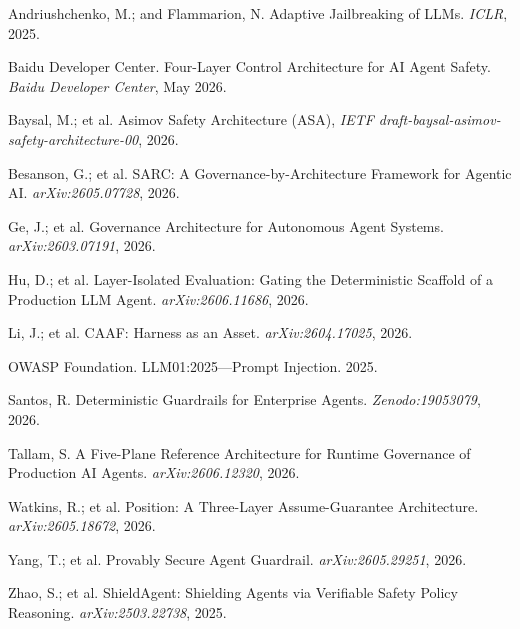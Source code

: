 \documentclass[letterpaper]{article}
\begin{document}

\begin{thebibliography}{}

Andriushchenko, M.; and Flammarion, N.
Adaptive Jailbreaking of LLMs.
{\em ICLR}, 2025.

Baidu Developer Center.
Four-Layer Control Architecture for AI Agent Safety.
{\em Baidu Developer Center}, May 2026.

Baysal, M.; et al.
Asimov Safety Architecture (ASA),
{\em IETF draft-baysal-asimov-safety-architecture-00}, 2026.

Besanson, G.; et al.
SARC: A Governance-by-Architecture Framework for Agentic AI.
{\em arXiv:2605.07728}, 2026.

Ge, J.; et al.
Governance Architecture for Autonomous Agent Systems.
{\em arXiv:2603.07191}, 2026.

Hu, D.; et al.
Layer-Isolated Evaluation: Gating the Deterministic Scaffold of a
Production LLM Agent.
{\em arXiv:2606.11686}, 2026.

Li, J.; et al.
CAAF: Harness as an Asset.
{\em arXiv:2604.17025}, 2026.

OWASP Foundation.
LLM01:2025---Prompt Injection.  2025.

Santos, R.
Deterministic Guardrails for Enterprise Agents.
{\em Zenodo:19053079}, 2026.

Tallam, S.
A Five-Plane Reference Architecture for Runtime Governance of
Production AI Agents.
{\em arXiv:2606.12320}, 2026.

Watkins, R.; et al.
Position: A Three-Layer Assume-Guarantee Architecture.
{\em arXiv:2605.18672}, 2026.

Yang, T.; et al.
Provably Secure Agent Guardrail.
{\em arXiv:2605.29251}, 2026.

Zhao, S.; et al.
ShieldAgent: Shielding Agents via Verifiable Safety Policy Reasoning.
{\em arXiv:2503.22738}, 2025.

\end{thebibliography}
\end{document}
